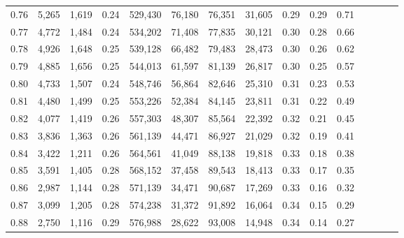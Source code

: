\begin{tabular}{rrrcrrrrrrrrrrr}
0.76 &   5,265 &  1,619 &                                       0.24 &  529,430 &   76,180 &   76,351 &   31,605 &  0.29 &  0.29 &                         0.71 \\
0.77 &   4,772 &  1,484 &                                       0.24 &  534,202 &   71,408 &   77,835 &   30,121 &  0.30 &  0.28 &                         0.66 \\
0.78 &   4,926 &  1,648 &                                       0.25 &  539,128 &   66,482 &   79,483 &   28,473 &  0.30 &  0.26 &                         0.62 \\
0.79 &   4,885 &  1,656 &                                       0.25 &  544,013 &   61,597 &   81,139 &   26,817 &  0.30 &  0.25 &                         0.57 \\
0.80 &   4,733 &  1,507 &                                       0.24 &  548,746 &   56,864 &   82,646 &   25,310 &  0.31 &  0.23 &                         0.53 \\
0.81 &   4,480 &  1,499 &                                       0.25 &  553,226 &   52,384 &   84,145 &   23,811 &  0.31 &  0.22 &                         0.49 \\
0.82 &   4,077 &  1,419 &                                       0.26 &  557,303 &   48,307 &   85,564 &   22,392 &  0.32 &  0.21 &                         0.45 \\
0.83 &   3,836 &  1,363 &                                       0.26 &  561,139 &   44,471 &   86,927 &   21,029 &  0.32 &  0.19 &                         0.41 \\
0.84 &   3,422 &  1,211 &                                       0.26 &  564,561 &   41,049 &   88,138 &   19,818 &  0.33 &  0.18 &                         0.38 \\
0.85 &   3,591 &  1,405 &                                       0.28 &  568,152 &   37,458 &   89,543 &   18,413 &  0.33 &  0.17 &                         0.35 \\
0.86 &   2,987 &  1,144 &                                       0.28 &  571,139 &   34,471 &   90,687 &   17,269 &  0.33 &  0.16 &                         0.32 \\
0.87 &   3,099 &  1,205 &                                       0.28 &  574,238 &   31,372 &   91,892 &   16,064 &  0.34 &  0.15 &                         0.29 \\
0.88 &   2,750 &  1,116 &                                       0.29 &  576,988 &   28,622 &   93,008 &   14,948 &  0.34 &  0.14 &                         0.27 \\

\end{tabular}
